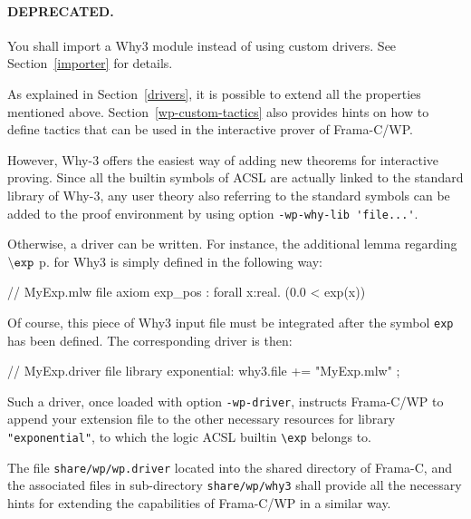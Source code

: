 \paragraph{DEPRECATED.} You shall import a Why3 module instead of using custom
drivers. See Section~\ref{importer} for details.

As explained in Section~\ref{drivers}, it is possible to extend all the properties mentioned
above. Section~\ref{wp-custom-tactics} also provides hints on how to define tactics that can be
used in the interactive prover of \textsf{Frama-C/WP}.

However, \textsf{Why-3} offers the easiest way of adding new theorems for interactive proving.
Since all the builtin symbols of \textsf{ACSL} are actually linked to the standard library
of \textsf{Why-3}, any user theory also referring to the standard symbols can be added to the proof
environment by using option \verb+-wp-why-lib 'file...'+.

Otherwise, a driver can be written. For instance, the additional lemma regarding $\mathtt{\backslash exp}$
p.\pageref{builtin-hyperbolic} for \textsf{Why3} is simply defined in the following way:

\begin{logs}
    // MyExp.mlw file
    axiom exp_pos : forall x:real. (0.0 <  exp(x))
\end{logs}

Of course, this piece of \textsf{Why3} input file must be integrated after the symbol
\verb+exp+ has been defined. The corresponding driver is then:

\begin{logs}
    // MyExp.driver file
    library exponential:
    why3.file += "MyExp.mlw" ;
\end{logs}

Such a driver, once loaded with option \verb+-wp-driver+, instructs \textsf{Frama-C/WP} to
append your extension file to the other necessary resources for library \verb+"exponential"+, to
which the logic ACSL builtin \verb+\exp+ belongs to.

The file \verb+share/wp/wp.driver+ located into the shared directory of \textsf{Frama-C},
and the associated files in sub-directory \verb+share/wp/why3+ shall provide
all the necessary hints for extending the capabilities of \textsf{Frama-C/WP} in a similar way.

